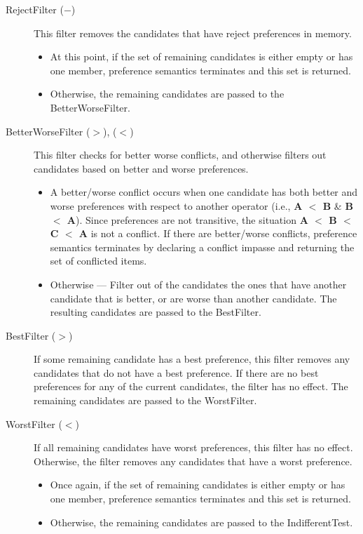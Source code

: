 \begin{description}
\item[RejectFilter ($-$) ] This filter removes the candidates that have
	reject preferences in memory. 
	\begin{itemize}
	\item At this point, if the set of remaining candidates is either empty or has one
	member, preference semantics terminates and this set is returned.
	\item Otherwise, the remaining candidates are passed to the
	BetterWorseFilter.
	\end{itemize}
\index{-}

\item[BetterWorseFilter ($>$), ($<$) ] This filter checks for better
	worse conflicts, and otherwise filters out candidates based on
	better and worse preferences.
\begin{itemize}
\item A better/worse conflict occurs when one candidate has both better and
	worse preferences with respect to another operator (i.e., \textbf{A $<$ B} 
	\& \textbf{B $<$ A}). Since preferences are not transitive, the situation 
	\textbf{A $<$ B $<$ C $<$ A} is not a conflict. If there are better/worse conflicts, 
	preference semantics terminates by declaring a conflict impasse and returning the
	set of conflicted items.
\item Otherwise ---
	Filter out of the candidates the ones that have
	another candidate that is better, or are worse than another candidate. 
	The resulting candidates are passed to the BestFilter.
\end{itemize}
\index{<}
\index{>}


\item[BestFilter ($>$) ] If some remaining candidate has a best preference,
	this filter removes any candidates that do not have
	a best preference. If there are no best preferences for any of the current
	candidates, the filter has no effect. The remaining candidates are passed
	to the WorstFilter.

\item[WorstFilter ($<$) ] If all remaining candidates have worst preferences, this filter
	has no effect. Otherwise, the filter removes any candidates that have
	a worst preference.
	\begin{itemize}
	\item Once again, if the set of remaining candidates is either empty or has one
	member, preference semantics terminates and this set is returned.
	\item Otherwise, the remaining candidates are passed to the
	IndifferentTest.
	\end{itemize}


\end{description}
